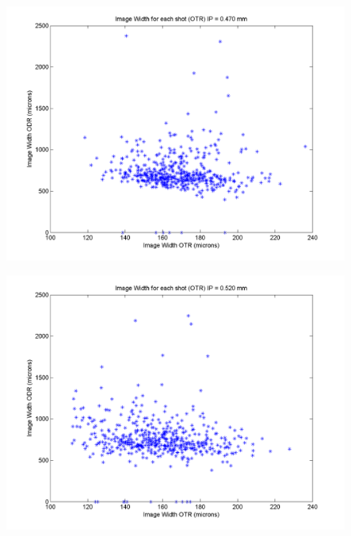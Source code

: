\documentclass[12pt]{article}
\begin{document}
\begin{figure}
\begin{center}
\includegraphics[scale=0.5]{Figures/ImageWidth_OTRODR_470.PNG}
\caption{}
\end{center}
\end{figure}

\begin{figure}
\begin{center}
\includegraphics[scale=0.5]{Figures/ImageWidth_OTRODR_520.PNG}
\caption{}
\end{center}
\end{figure}
\end{document}
